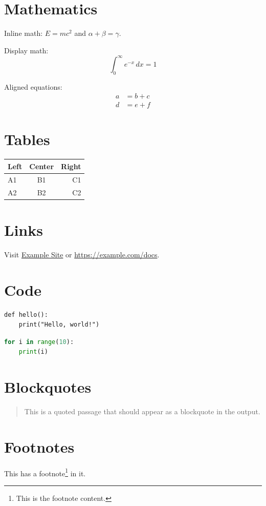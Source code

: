 \documentclass{article}
\begin{document}
\section{Mathematics}

Inline math: $E = mc^2$ and $\alpha + \beta = \gamma$.

Display math:
\begin{equation}
\int_0^\infty e^{-x}\, dx = 1
\end{equation}

Aligned equations:
\begin{align}
a &= b + c \\
d &= e + f
\end{align}

\section{Tables}

\begin{tabular}{|l|c|r|}
\hline
Left & Center & Right \\
\hline
A1 & B1 & C1 \\
A2 & B2 & C2 \\
\hline
\end{tabular}

\section{Links}

Visit \href{https://example.com}{Example Site} or \url{https://example.com/docs}.

\section{Code}

\begin{verbatim}
def hello():
    print("Hello, world!")
\end{verbatim}

\begin{lstlisting}[language=Python]
for i in range(10):
    print(i)
\end{lstlisting}

\section{Blockquotes}

\begin{quote}
This is a quoted passage that should appear as a blockquote in the output.
\end{quote}

\section{Footnotes}

This has a footnote\footnote{This is the footnote content.} in it.
\end{document}
